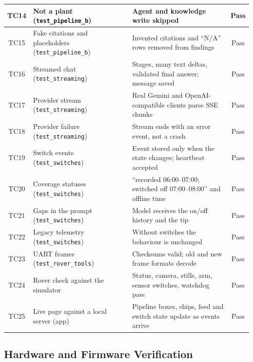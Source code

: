 {\begin{longtable}{|c|P{4.3cm}|P{5.7cm}|c|}
TC14 & Not a plant (\texttt{test\_pipeline\_b}) & Agent and knowledge write skipped & Pass\\\hline
TC15 & Fake citations and placeholders (\texttt{test\_pipeline\_b}) & Invented citations and ``N/A'' rows removed from findings & Pass\\\hline
TC16 & Streamed chat (\texttt{test\_streaming}) & Stages, many text deltas, validated final answer; message saved & Pass\\\hline
TC17 & Provider stream (\texttt{test\_streaming}) & Real Gemini and OpenAI-compatible clients parse SSE chunks & Pass\\\hline
TC18 & Provider failure (\texttt{test\_streaming}) & Stream ends with an error event, not a crash & Pass\\\hline
TC19 & Switch events (\texttt{test\_switches}) & Event stored only when the state changes; heartbeat accepted & Pass\\\hline
TC20 & Coverage statuses (\texttt{test\_switches}) & ``recorded 06:00--07:00; switched off 07:00--08:00'' and offline time & Pass\\\hline
TC21 & Gaps in the prompt (\texttt{test\_switches}) & Model receives the on/off history and the tip & Pass\\\hline
TC22 & Legacy telemetry (\texttt{test\_switches}) & Without switches the behaviour is unchanged & Pass\\\hline
TC23 & UART frames (\texttt{test\_rover\_tools}) & Checksums valid; old and new frame formats decode & Pass\\\hline
TC24 & Rover check against the simulator & Status, camera, stills, arm, sensor switches, watchdog pass & Pass\\\hline
TC25 & Live page against a local server (app) & Pipeline boxes, chips, feed and switch state update as events arrive & Pass\\\hline
\end{longtable}
}

\subsection{Hardware and Firmware Verification}

